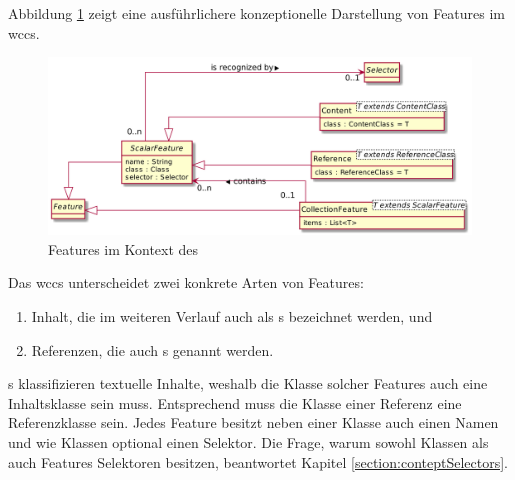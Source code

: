         Abbildung \ref{image:conceptFeatures} zeigt eine ausführlichere
        konzeptionelle Darstellung von Features im \gls{wccs}.

        \begin{figure}[htb]
            \centering
            \includegraphics[scale=\imageScalingFactor]{../resources/concept/features.png}
            \caption{Features im Kontext des }
            \label{image:conceptFeatures}
        \end{figure}

        Das \gls{wccs} unterscheidet zwei konkrete Arten von Features:
        
        \begin{enumerate}
            \item Inhalt, die im weiteren Verlauf auch als {\contentFeature}s bezeichnet werden, und
            \item Referenzen, die auch {}s genannt werden.
        \end{enumerate}

        {\contentFeature}s klassifizieren textuelle Inhalte,
        weshalb die Klasse solcher Features auch eine Inhaltsklasse sein muss.
        Entsprechend muss die Klasse einer Referenz eine Referenzklasse sein.
        Jedes Feature besitzt neben einer Klasse auch einen Namen und wie Klassen optional einen Selektor.
        Die Frage, warum sowohl Klassen als auch Features Selektoren besitzen,
        beantwortet Kapitel \ref{section:conteptSelectors}.

